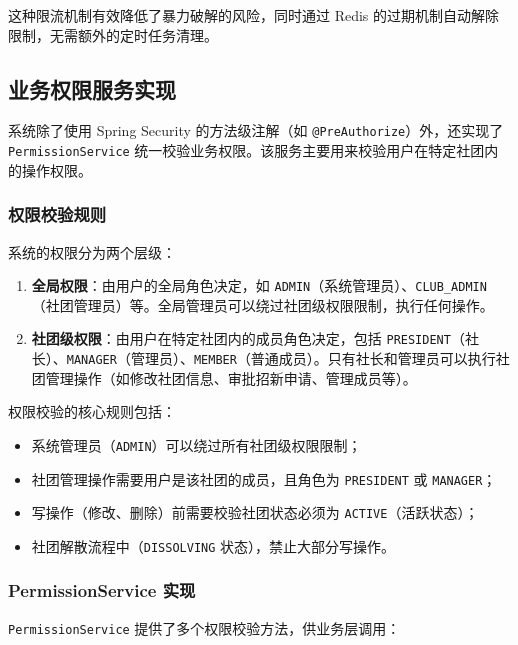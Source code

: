 这种限流机制有效降低了暴力破解的风险，同时通过 Redis 的过期机制自动解除限制，无需额外的定时任务清理。

\subsection{业务权限服务实现}

系统除了使用 Spring Security 的方法级注解（如 \texttt{@PreAuthorize}）外，还实现了 \texttt{PermissionService} 统一校验业务权限。该服务主要用来校验用户在特定社团内的操作权限。

\subsubsection{权限校验规则}

系统的权限分为两个层级：

\begin{enumerate}
  \item \textbf{全局权限}：由用户的全局角色决定，如 \texttt{ADMIN}（系统管理员）、\texttt{CLUB\_ADMIN}（社团管理员）等。全局管理员可以绕过社团级权限限制，执行任何操作。

  \item \textbf{社团级权限}：由用户在特定社团内的成员角色决定，包括 \texttt{PRESIDENT}（社长）、\texttt{MANAGER}（管理员）、\texttt{MEMBER}（普通成员）。只有社长和管理员可以执行社团管理操作（如修改社团信息、审批招新申请、管理成员等）。
\end{enumerate}

权限校验的核心规则包括：

\begin{itemize}
  \item 系统管理员（\texttt{ADMIN}）可以绕过所有社团级权限限制；
  \item 社团管理操作需要用户是该社团的成员，且角色为 \texttt{PRESIDENT} 或 \texttt{MANAGER}；
  \item 写操作（修改、删除）前需要校验社团状态必须为 \texttt{ACTIVE}（活跃状态）；
  \item 社团解散流程中（\texttt{DISSOLVING} 状态），禁止大部分写操作。
\end{itemize}

\subsubsection{PermissionService 实现}

\texttt{PermissionService} 提供了多个权限校验方法，供业务层调用：

